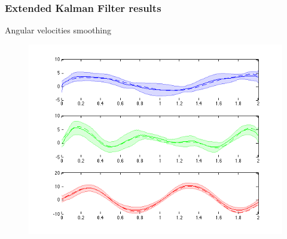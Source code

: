 \documentclass[xcolor=dvipsnames]{beamer}
\begin{document}
\begin{frame}
  \frametitle{Extended Kalman Filter results}
   Angular velocities smoothing
\begin{figure} 
  \centering 
	  \includegraphics[height=0.70\hsize]{images/png/angVel.png} 
\end{figure}
\end{frame}


%   
\end{document}
